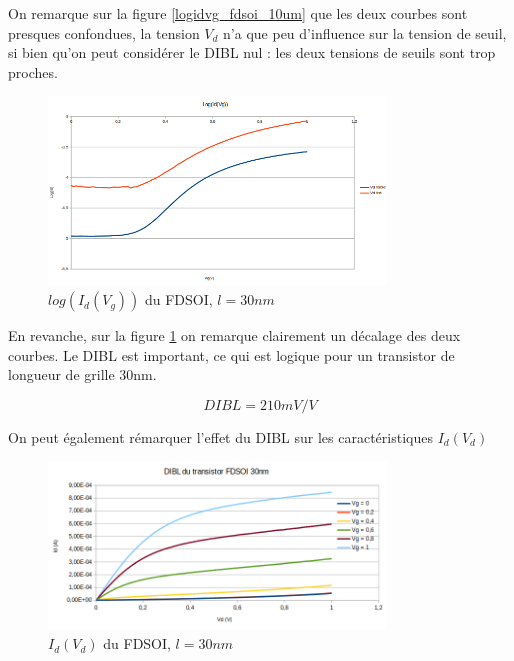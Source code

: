 \documentclass[a4paper,11pt]{report}
\begin{document}
On remarque sur la figure \ref{logidvg_fdsoi_10um} que les deux courbes sont presques confondues, la tension $V_d$ n'a que peu d'influence sur la tension de seuil, si bien qu'on peut considérer le DIBL nul : les deux tensions de seuils sont trop proches.

\begin{figure}[h]
    \begin{center}
        \includegraphics[width=0.8\textwidth]{Images/logidvg30nm}
        \caption{$log(I_d(V_g))$ du FDSOI, $l = 30nm$}
        \label{logidvg_fdsoi_30nm}
    \end{center}
\end{figure}

En revanche, sur la figure \ref{logidvg_fdsoi_30nm} on remarque clairement un décalage des deux courbes. Le DIBL est important, ce qui est logique pour un transistor de longueur de grille 30nm. 

\[DIBL = 210mV/V\]

On peut également rémarquer l'effet du DIBL sur les caractéristiques $I_d(V_d)$

\begin{figure}[h]
    \begin{center}
        \includegraphics[width=0.8\textwidth]{Images/DIBL-11-30}
        \caption{$I_d(V_d)$ du FDSOI, $l = 30nm$}
        \label{DIBL_fdsoi_30nm}
    \end{center}
\end{figure}
\end{document}
